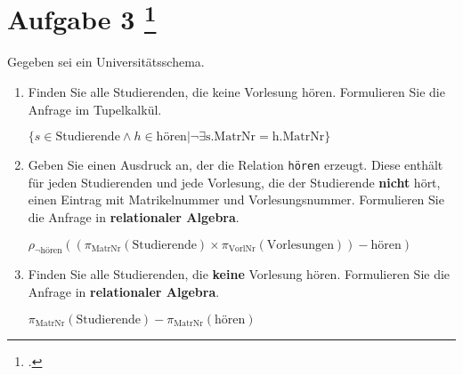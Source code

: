\documentclass{lehramt-informatik-aufgabe}
\begin{document}
\section{Aufgabe 3
\footcite{examen:66116:2020:03}}

Gegeben sei ein Universitätsschema.

\begin{enumerate}


\item Finden Sie alle Studierenden, die keine Vorlesung hören.
Formulieren Sie die Anfrage im Tupelkalkül.

\begin{liAntwort}
$\{ s \in \text{Studierende} \land h \in \text{hören} | \neg \exists \text{s.MatrNr} = \text{h.MatrNr} \}$
\end{liAntwort}


\item Geben Sie einen Ausdruck an, der die Relation \neg \texttt{hören}
erzeugt. Diese enthält für jeden Studierenden und jede Vorlesung, die
der Studierende \textbf{nicht} hört, einen Eintrag mit Matrikelnummer
und Vorlesungsnummer. Formulieren Sie die Anfrage in
\textbf{relationaler Algebra}.

\begin{liAntwort}
$\rho_{\neg \text{hören}} \left(
(
  \pi_{\text{MatrNr}}(\text{Studierende})
  \times
  \pi_{\text{VorlNr}}(\text{Vorlesungen})
) - \text{hören}
\right)
$
\end{liAntwort}


\item Finden Sie alle Studierenden, die \textbf{keine} Vorlesung hören.
Formulieren Sie die Anfrage in \textbf{relationaler Algebra}.

\begin{liAntwort}
$\pi_{\text{MatrNr}}(\text{Studierende}) - \pi_{\text{MatrNr}}(\text{hören})$
\end{liAntwort}
\end{enumerate}
\end{document}
